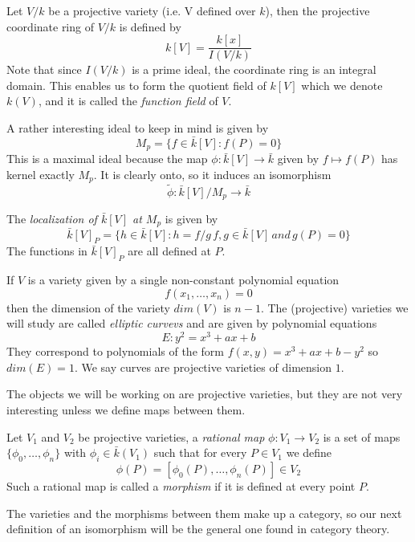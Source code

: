 \begin{mydef}
 Let $V/k$ be a projective variety (i.e. V defined over $k$), then the projective coordinate
ring of $V/k$ is defined by
$$ k[V] = \frac{k[x]}{I(V/k)}$$
Note that since $I(V/k)$ is a prime ideal, the coordinate ring is an integral domain.
This enables us to form the quotient field of $k[V]$ which we denote $k(V)$, and it is called
the \emph{function field} of $V$.
\end{mydef}

A rather interesting ideal to keep in mind is given by
$$ M_p = \{ f\in \bar{k}[V] : f(P)=0 \} $$
This is a maximal ideal because the map $\phi: \bar{k}[V] \rightarrow \bar{k}$ given by
$ f \mapsto f(P) $ has kernel exactly $M_p$. It is clearly onto, so it induces an
isomorphism $$\tilde{\phi}: \bar{k}[V]/M_p \rightarrow \bar{k} $$

\begin{mydef}
 The \emph{localization of $\bar{k}[V]$ at $M_p$} is given by
$$ \bar{k}[V]_P = \{ h \in \bar{k}[V] : h = f/g\, f,g\in \bar{k}[V]\, and\, g(P)=0 \} $$
The functions in $\bar{k}[V]_P$ are all defined at $P$.
\end{mydef}

\begin{ex}
 If $V$ is a variety given by a single non-constant polynomial equation
$$f(x_1,\ldots,x_n) = 0$$ 
then the dimension of the variety $dim(V)$ is $n-1$. The (projective) varieties
we will study are called \emph{elliptic curvevs} and are
given by polynomial equations
$$E: y^2 = x^3+ax+b$$
They correspond to polynomials of the form $f(x,y) = x^3+ax+b-y^2$ so $dim(E)=1$.
We say curves are projective varieties of dimension $1$.
\end{ex}

The objects we will be working on are projective varieties, but they are not
very interesting unless we define maps between them.

\begin{mydef}
 Let $V_1$ and $V_2$ be projective varieties, a \emph{rational map} $\phi: V_1 \rightarrow V_2$
is a set of maps $\{\phi_0,\ldots,\phi_n\}$ with $\phi_i \in \bar{k}(V_1)$ such that for every
$P\in V_1$ we define
$$\phi(P) = [\phi_0(P),\ldots,\phi_n(P)] \in V_2$$
Such a rational map is called a \emph{morphism} if it is defined at every point $P$.
\end{mydef}

The varieties and the morphisms between them make up a category, so our next
definition of an isomorphism will be the general one found in category theory.


